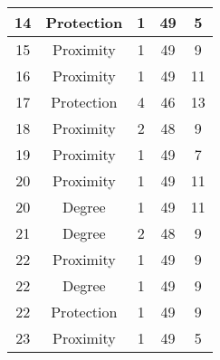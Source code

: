 \documentclass[results.tex]{subfiles}
\begin{document}
\begin{center}
\begin{tabular}{| c || c | c | c | c |}
            \hline
            14                      & Protection                   & 1                      & 49                      & 5                    \\
            \hline
            15                      & Proximity                    & 1                      & 49                      & 9                    \\
            \hline
            16                      & Proximity                    & 1                      & 49                      & 11                   \\
            \hline
            17                      & Protection                   & 4                      & 46                      & 13                   \\
            \hline
            18                      & Proximity                    & 2                      & 48                      & 9                    \\
            \hline
            19                      & Proximity                    & 1                      & 49                      & 7                    \\
            \hline
            20                      & Proximity                    & 1                      & 49                      & 11                   \\
            \hline
            20                      & Degree                       & 1                      & 49                      & 11                   \\
            \hline
            21                      & Degree                       & 2                      & 48                      & 9                    \\
            \hline
            22                      & Proximity                    & 1                      & 49                      & 9                    \\
            \hline
            22                      & Degree                       & 1                      & 49                      & 9                    \\
            \hline
            22                      & Protection                   & 1                      & 49                      & 9                    \\
            \hline
            23                      & Proximity                    & 1                      & 49                      & 5                    \\

\end{tabular}
\end{center}
\end{document}
